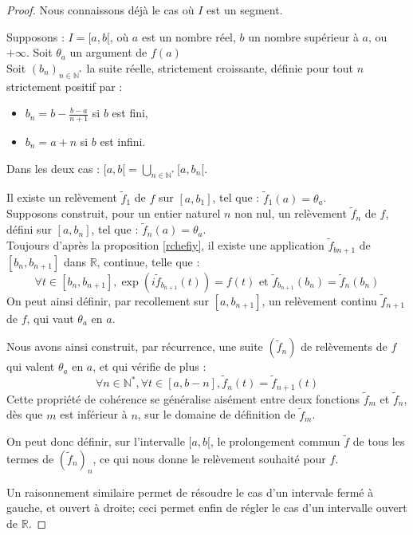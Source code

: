 \begin{proof}
Nous connaissons d\'ej\`a le cas o\`u $I$ est un segment.

Supposons : $I=[a,b[$, o\`u $a$ est un nombre r\'eel, $b$ un nombre sup\'erieur \`a $a$, ou $+\infty$. Soit $\theta_a$ un argument de $f(a)$\\
Soit $(b_n)_{n\in\mathbb{N}^{\ast}}$ la suite r\'eelle, strictement croissante, d\'efinie pour tout $n$ strictement positif par :
\begin{itemize}
\item $b_n=b-\frac{b-a}{n+1}$ si $b$ est fini,
\item $b_n=a+n$ si $b$ est infini.
\end{itemize}
Dans les deux cas : $[a,b[=\underset{n\in\mathbb{N}^{\ast}}{\bigcup}[a,b_n[$.

Il existe un rel\`evement $\tilde{f}_1$ de $f$ sur $[a,b_1]$,  tel que : $\tilde{f}_1(a)=\theta_a$.\\
Supposons construit, pour un entier naturel $n$ non nul, un rel\`evement $\tilde{f}_n$ de $f$, d\'efini sur $[a,b_n]$, tel que : $\tilde{f}_n(a)=\theta_a$.\\
Toujours d'apr\`es la proposition \ref{rchefiy}, %
il existe une application $\tilde{f}_{b{n+1}}$ de $[b_n,b_{n+1}]$ dans $\mathbb{R}$, continue, telle que :
\[\forall t \in [b_n,b_{n+1}], \exp (i\tilde{f}_{b_{n+1}}(t))=f(t) \text{ et }\tilde{f}_{b_{n+1}}(b_n)=\tilde{f}_n(b_n)\]
On peut ainsi d\'efinir, par recollement sur $[a,b_{n+1}]$, un rel\`evement continu $\tilde{f}_{n+1}$ de $f$, qui vaut $\theta_a$ en $a$.

Nous avons ainsi construit, par r\'ecurrence, une suite $(\tilde{f}_n)$ de rel\`evements de $f$ qui valent $\theta_a$ en $a$, et qui v\'erifie de plus :
\[\forall n \in\mathbb{N}^{\ast}, \forall t \in [a,b-n], \tilde{f}_n(t)=\tilde{f}_{n+1}(t)\]
Cette propri\'et\'e de coh\'erence se g\'en\'eralise ais\'ement entre deux fonctions $\tilde{f}_m$ et $\tilde{f}_n$, %
d\`es que $m$ est inf\'erieur \`a $n$, sur le domaine de d\'efinition de $\tilde{f}_m$.

On peut donc d\'efinir, sur l'intervalle $[a,b[$, le prolongement commun $\tilde{f}$ de tous les termes de $(\tilde{f}_n)_n$, %
ce qui nous donne le rel\`evement souhait\'e pour $f$.

Un raisonnement similaire permet de r\'esoudre le cas d'un intervale ferm\'e \`a gauche, et ouvert \`a droite; %
ceci permet enfin de r\'egler le cas d'un intervalle ouvert de $\mathbb{R}$.
\end{proof}

